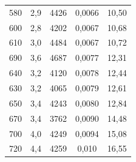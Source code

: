 \begin{table}
\begin{tabular}{c c c c c}
580	& 2,9	& 4426 & 0,0066 & 10,50 \\
600	& 2,8	& 4202 & 0,0067 & 10,68 \\
610	& 3,0	& 4484 & 0,0067 & 10,72 \\
690	& 3,6	& 4687 & 0,0077 & 12,31 \\
640	& 3,2	& 4120 & 0,0078 & 12,44 \\
630	& 3,2	& 4065 & 0,0079 & 12,61 \\
650	& 3,4	& 4243 & 0,0080 & 12,84 \\
670	& 3,4	& 3762 & 0,0090 & 14,48 \\
700	& 4,0	& 4249 & 0,0094 & 15,08 \\
720	& 4,4	& 4259 & 0,010 & 16,55 \\
    \bottomrule
    \end{tabular}
\end{table}
